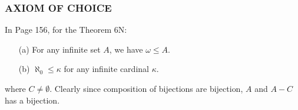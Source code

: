 \subsubsection{AXIOM OF CHOICE}
In Page 156, for the Theorem 6N:
\begin{leftbar}
    \begin{itemize}
        \item[(a)] For any infinite set \( A \), we have \( \omega \leq A \).
        \item[(b)] \( \aleph_0 \leq \kappa \) for any infinite cardinal \( \kappa \).
    \end{itemize}
\end{leftbar}


where \(C \neq \emptyset \).
Clearly since composition of bijections are bijection, \(A\) and \(A - C\) has a bijection.